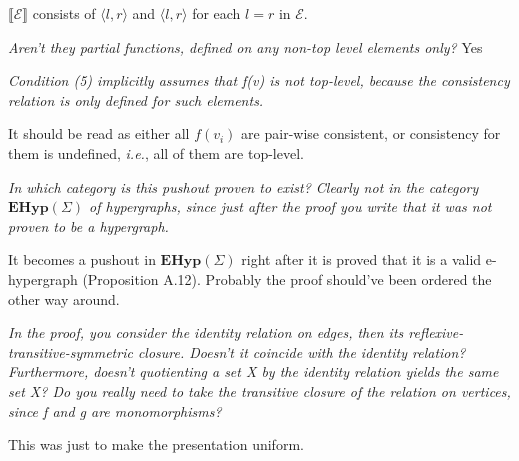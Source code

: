 \documentclass{article}
\begin{document}
$\llbracket \mathcal{E} \rrbracket$ consists of $\langle l, r \rangle$ and $\langle l, r \rangle$ for each $l = r$ in $\mathcal{E}$.

\textit{Aren't they partial functions, defined on any non-top level elements only?}
Yes

\textit{Condition (5) implicitly assumes that f(v) is not top-level, because the
consistency relation is only defined for such elements.}

It should be read as either all $f(v_i)$ are pair-wise consistent, or consistency for them is undefined, \textit{i.e.}, all of them are top-level.

\textit{In which category is this pushout proven to exist? Clearly not in the category
$\mathbf{EHyp}(\Sigma)$ of hypergraphs, since just after the proof you write that it was not
proven to be a hypergraph.}

It becomes a pushout in $\mathbf{EHyp}(\Sigma)$ right after it is proved that it is a valid e-hypergraph (Proposition A.12).
Probably the proof should've been ordered the other way around.

\textit{In the proof, you consider the identity relation on edges, then its
reflexive-transitive-symmetric closure. Doesn't it coincide with the identity
relation? Furthermore, doesn't quotienting a set X by the identity relation
yields the same set X?
Do you really need to take the transitive closure of the relation on vertices,
since f and g are monomorphisms?}

This was just to make the presentation uniform.
\end{document}
